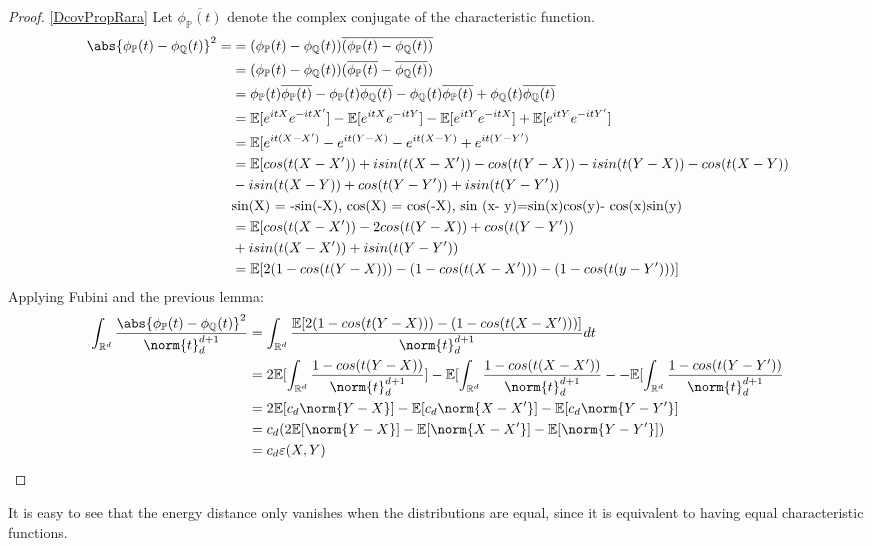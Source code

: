 \begin{proof}
\ref{DcovPropRara} Let $\overline{\phi_{\mathbb{P}}(t)}$ denote the complex conjugate of the characteristic function.\label{DcovDemRara}
\begin{equation}{}
\begin{split}
\abs{\phi_{\mathbb{P}}(t)-\phi_{\mathbb{Q}}(t)}^{2} = 
& = (\phi_{\mathbb{P}}(t)-\phi_{\mathbb{Q}}(t))\overline{(\phi_{\mathbb{P}}(t)-\phi_{\mathbb{Q}}(t))} \\
& = (\phi_{\mathbb{P}}(t)-\phi_{\mathbb{Q}}(t))(\overline{\phi_{\mathbb{P}}(t)}-\overline{\phi_{\mathbb{Q}}(t)})\\
&= \phi_{\mathbb{P}}(t)\overline{\phi_{\mathbb{P}}(t)} - \phi_{\mathbb{P}}(t)\overline{\phi_{\mathbb{Q}}(t)} - \phi_{\mathbb{Q}}(t)\overline{\phi_{\mathbb{P}}(t)} + 
\phi_{\mathbb{Q}}(t)\overline{\phi_{\mathbb{Q}}(t)} \\
&=\mathbb{E}[e^{itX}e^{-itX'}]-\mathbb{E}[e^{itX}e^{-itY}]
-\mathbb{E}[e^{itY}e^{-itX}] + \mathbb{E}[e^{itY}e^{-itY'}]\\
&=\mathbb{E}[e^{it(X-X')}-e^{it(Y-X)}-e^{it(X-Y)}+e^{it(Y-Y')} \\
&=\mathbb{E}[cos(t(X-X')) + isin(t(X-X'))-cos(t(Y-X))-isin(t(Y-X)) -cos(t(X-Y)) \\
&-isin(t(X-Y)) + cos(t(Y-Y'))+isin(t(Y-Y')) \\
&\text{sin(X) = -sin(-X), cos(X) = cos(-X), sin (x- y)=sin(x)cos(y)- cos(x)sin(y)}\\
&=\mathbb{E}[cos(t(X-X')) - 2cos(t(Y-X)) + cos(t(Y-Y')) \\
& + isin(t(X-X')) + isin(t(Y-Y'))\\
&= \mathbb{E}[2(1-cos(t(Y-X)))-(1-cos(t(X-X')))-(1-cos(t(y-Y')))]
\end{split}
\end{equation}
Applying Fubini and the previous lemma:
\begin{equation}{}
\begin{split}
\int_{\mathbb{R}^{d}}\frac{\abs{\phi_{\mathbb{P}}(t)-\phi_{\mathbb{Q}}(t)}^{2}}{\norm{t}^{d+1}_{d}}
&=\int_{\mathbb{R}^{d}}\frac{\mathbb{E}[2(1-cos(t(Y-X)))-(1-cos(t(X-X')))]}{\norm{t}^{d+1}_{d}} dt \\
&=2\mathbb{E}[\int_{\mathbb{R}^{d}}\frac{1-cos(t(Y-X))}{\norm{t}^{d+1}_{d}}] - \mathbb{E}[\int_{\mathbb{R}^{d}}\frac{1-cos(t(X-X'))}{\norm{t}^{d+1}_{d}} - - \mathbb{E}[\int_{\mathbb{R}^{d}}\frac{1-cos(t(Y-Y'))}{\norm{t}^{d+1}_{d}} \\
&=2\mathbb{E}[c_{d}\norm{Y-X}] - \mathbb{E}[c_{d}\norm{X-X'}] -\mathbb{E}[c_{d}\norm{Y-Y'}] \\
&= c_{d}(2\mathbb{E}[\norm{Y-X}] - \mathbb{E}[\norm{X-X'}] -\mathbb{E}[\norm{Y-Y'}])\\
&= c_{d}\varepsilon(X,Y)
\end{split}
\end{equation}
\end{proof}
It is easy to see that the energy distance only vanishes when the distributions are equal, since it is equivalent to having equal characteristic functions.

